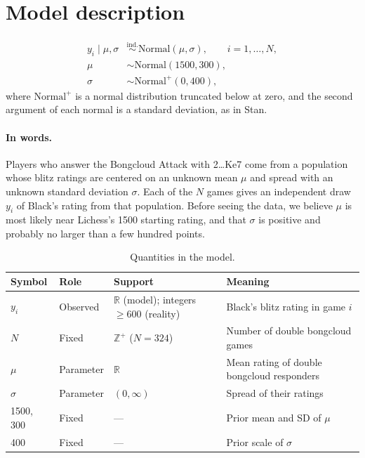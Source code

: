 \documentclass{article}
\begin{document}
\section*{Model description}
\begin{align*}
y_i \mid \mu, \sigma &\overset{\text{ind.}}{\sim} \mathrm{Normal}(\mu, \sigma), \qquad i = 1, \dots, N,\\
\mu &\sim \mathrm{Normal}(1500, 300),\\
\sigma &\sim \mathrm{Normal}^{+}(0, 400),
\end{align*}
where $\mathrm{Normal}^{+}$ is a normal distribution truncated below at zero,
and the second argument of each normal is a standard deviation, as in Stan.

\paragraph{In words.} Players who answer the Bongcloud Attack with 2\ldots Ke7 come from a population
whose blitz ratings are centered on an unknown mean $\mu$ and spread with an unknown standard
deviation $\sigma$. Each of the $N$ games gives an independent draw $y_i$ of Black's rating from
that population. Before seeing the data, we believe $\mu$ is most likely near Lichess's 1500
starting rating, and that $\sigma$ is positive and probably no larger than a few hundred points.

\begin{table}[H]
\centering
\caption{Quantities in the model.}
\label{tab:model-quantities}
\begin{tabular}{lllp{5cm}}
\toprule
\textbf{Symbol} & \textbf{Role} & \textbf{Support} & \textbf{Meaning} \\
\midrule
$y_i$      & Observed  & $\mathbb{R}$ (model); integers $\geq 600$ (reality) & Black's blitz rating in game $i$ \\
$N$        & Fixed     & $\mathbb{Z}^{+}$ ($N = 324$) & Number of double bongcloud games \\
$\mu$      & Parameter & $\mathbb{R}$     & Mean rating of double bongcloud responders \\
$\sigma$   & Parameter & $(0, \infty)$    & Spread of their ratings \\
1500, 300  & Fixed     & ---              & Prior mean and SD of $\mu$ \\
400        & Fixed     & ---              & Prior scale of $\sigma$ \\
\bottomrule
\end{tabular}
\end{table}
\end{document}

